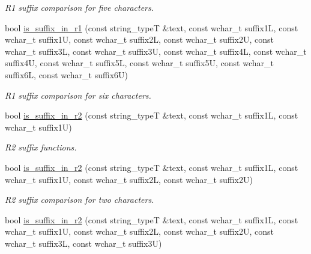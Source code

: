 \begin{DoxyCompactItemize}
\begin{DoxyCompactList}\small\item\em R1 suffix comparison for five characters. \end{DoxyCompactList}\item 
\hypertarget{group___stemming_ga19c2ee5166c7a9c81160408438c1f9a0}{bool \hyperlink{group___stemming_ga19c2ee5166c7a9c81160408438c1f9a0}{is\-\_\-suffix\-\_\-in\-\_\-r1} (const string\-\_\-type\-T \&text, const wchar\-\_\-t suffix1\-L, const wchar\-\_\-t suffix1\-U, const wchar\-\_\-t suffix2\-L, const wchar\-\_\-t suffix2\-U, const wchar\-\_\-t suffix3\-L, const wchar\-\_\-t suffix3\-U, const wchar\-\_\-t suffix4\-L, const wchar\-\_\-t suffix4\-U, const wchar\-\_\-t suffix5\-L, const wchar\-\_\-t suffix5\-U, const wchar\-\_\-t suffix6\-L, const wchar\-\_\-t suffix6\-U)}\label{group___stemming_ga19c2ee5166c7a9c81160408438c1f9a0}

\begin{DoxyCompactList}\small\item\em R1 suffix comparison for six characters. \end{DoxyCompactList}\item 
bool \hyperlink{group___stemming_gac2c9cace7e6d90ca0b8c08f2ca2809e3}{is\-\_\-suffix\-\_\-in\-\_\-r2} (const string\-\_\-type\-T \&text, const wchar\-\_\-t suffix1\-L, const wchar\-\_\-t suffix1\-U)
\begin{DoxyCompactList}\small\item\em R2 suffix functions. \end{DoxyCompactList}\item 
\hypertarget{group___stemming_ga8325bde2b5c8d5676d2b8e2b822b29a4}{bool \hyperlink{group___stemming_ga8325bde2b5c8d5676d2b8e2b822b29a4}{is\-\_\-suffix\-\_\-in\-\_\-r2} (const string\-\_\-type\-T \&text, const wchar\-\_\-t suffix1\-L, const wchar\-\_\-t suffix1\-U, const wchar\-\_\-t suffix2\-L, const wchar\-\_\-t suffix2\-U)}\label{group___stemming_ga8325bde2b5c8d5676d2b8e2b822b29a4}

\begin{DoxyCompactList}\small\item\em R2 suffix comparison for two characters. \end{DoxyCompactList}\item 
\hypertarget{group___stemming_gab5c71d01e3285eec2e79521c1b76f79d}{bool \hyperlink{group___stemming_gab5c71d01e3285eec2e79521c1b76f79d}{is\-\_\-suffix\-\_\-in\-\_\-r2} (const string\-\_\-type\-T \&text, const wchar\-\_\-t suffix1\-L, const wchar\-\_\-t suffix1\-U, const wchar\-\_\-t suffix2\-L, const wchar\-\_\-t suffix2\-U, const wchar\-\_\-t suffix3\-L, const wchar\-\_\-t suffix3\-U)}\label{group___stemming_gab5c71d01e3285eec2e79521c1b76f79d}


\end{DoxyCompactItemize}
